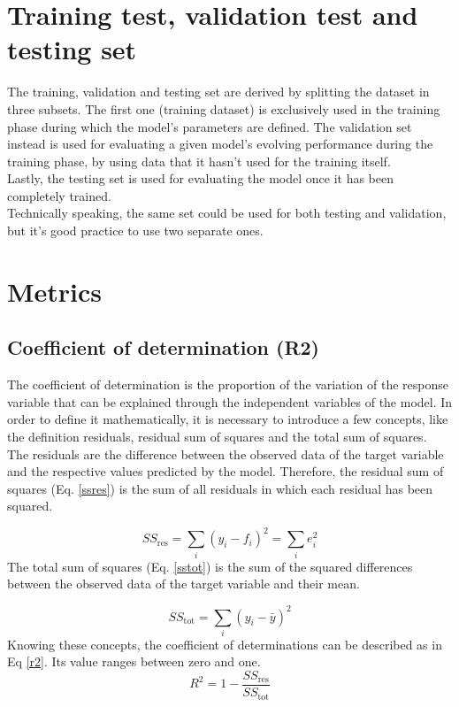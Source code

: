\section{Training test, validation test and testing set}
The training, validation and testing set are derived by splitting the dataset in three subsets. The first one (training dataset) is exclusively used in the training phase during which the model’s parameters are defined.
The validation set instead is used for evaluating a given model’s evolving performance during the training phase, by using data that it hasn’t used for the training itself.
\\Lastly, the testing set is used for evaluating the model once it has been completely trained. 
\\Technically speaking, the same set could be used for both testing and validation, but it’s good practice to use two separate ones.


\section{Metrics}
\subsection{Coefficient of determination (R2)}
The coefficient of determination \autocite{12} is the proportion of the variation of the response variable that can be explained through the independent variables of the model.
In order to define it mathematically, it is necessary to introduce a few concepts, like the definition residuals, residual sum of squares and the total sum of squares.
\\The residuals are the difference between the observed data of the target variable and the respective values predicted by the model. Therefore, the residual sum of squares (Eq. \eqref{ssres}) is the sum of all residuals in which each residual has been squared.

\begin{equation}
S S_{\mathrm{res}}=\sum_{i}\left(y_{i}-f_{i}\right)^{2}=\sum_{i} e_{i}^{2}
\label{ssres}
\end{equation}
The total sum of squares (Eq. \eqref{sstot}) is the sum of the squared differences between the observed data of the target variable and their mean.

\begin{equation}
S S_{\mathrm{tot}}=\sum_{i}\left(y_{i}-\bar{y}\right)^{2}
\label{sstot}
\end{equation}
Knowing these concepts, the coefficient of determinations can be described as in Eq \eqref{r2}. Its value ranges between zero and one.
\begin{equation}
R^{2}=1-\frac{S S_{\mathrm{res}}}{S S_{\mathrm{tot}}}
\label{r2}
\end{equation}

